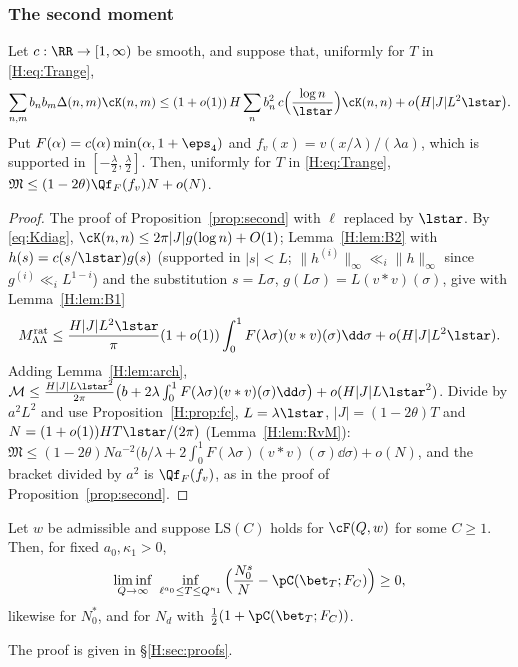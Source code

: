 \subsubsection*{The second moment}
\begin{proposition}\label{H:prop:second}
Let $c:\RR\to[1,\infty)$ be smooth, and suppose that, uniformly for $T$ in \eqref{H:eq:Trange},
\begin{equation}\label{H:eq:profile}
\sum_{n,m}b_nb_m\Delta(n,m)\cK(n,m)\le(1+o(1))\,H\sum_nb_n^2\,c\Big(\frac{\log n}{\lstar}\Big)\cK(n,n)+o\big(H|J|L^2\lstar\big).
\end{equation}
Put $F(\alpha)=c(\alpha)\min(\alpha,1+\eps_4)$ and $f_v(x)=v(x/\lambda)/(\lambda a)$, which is supported in $[-\frac\lambda2,\frac\lambda2]$. Then, uniformly for $T$ in \eqref{H:eq:Trange}, $\mathfrak M\le(1-2\theta)\Qf_F(f_v)N+o(N)$.
\end{proposition}
\begin{proof}
The proof of Proposition~\ref{prop:second} with $\ell$ replaced by $\lstar$. By \eqref{eq:Kdiag}, $\cK(n,n)\le2\pi|J|g(\log n)+O(1)$; Lemma~\ref{H:lem:B2} with $h(s)=c(s/\lstar)g(s)$ (supported in $|s|<L$; $\|h^{(i)}\|_\infty\ll_i\|h\|_\infty$ since $g^{(i)}\ll_iL^{1-i}$) and the substitution $s=L\sigma$, $g(L\sigma)=L(v*v)(\sigma)$, give with Lemma~\ref{H:lem:B1}
\[
M^{\rm rat}_{\Lambda\Lambda}\le\frac{H|J|L^2\lstar}\pi(1+o(1))\int_0^1F(\lambda\sigma)(v*v)(\sigma)\dd\sigma+o(H|J|L^2\lstar).
\]
Adding Lemma~\ref{H:lem:arch},
$\mathcal M\le\frac{H|J|L\lstar^2}{2\pi}\big(b+2\lambda\int_0^1F(\lambda\sigma)(v*v)(\sigma)\dd\sigma\big)+o(H|J|L\lstar^2)$. Divide by $a^2L^2$ and use Proposition~\ref{H:prop:fc}, $L=\lambda\lstar$, $|J|=(1-2\theta)T$ and $N=(1+o(1))HT\lstar/(2\pi)$ (Lemma~\ref{H:lem:RvM}): $\mathfrak M\le(1-2\theta)Na^{-2}\big(b/\lambda+2\int_0^1F(\lambda\sigma)(v*v)(\sigma)\dd\sigma\big)+o(N)$, and the bracket divided by $a^2$ is $\Qf_F(f_v)$, as in the proof of Proposition~\ref{prop:second}.
\end{proof}

\begin{theorem}\label{H:thm:cond}
Let $w$ be admissible and suppose $\mathrm{LS}(C)$ holds for $\cF(Q,w)$ for some $C\ge1$. Then, for fixed $a_0,\kappa_1>0$,
\[
\liminf_{Q\to\infty}\ \inf_{\ell^{a_0}\le T\le Q^{\kappa_1}}\Big(\frac{N^s_0}N-\pC(\bet_T;F_C)\Big)\ge0,
\]
likewise for $N^*_0$, and for $N_d$ with $\frac12(1+\pC(\bet_T;F_C))$.
\end{theorem}
The proof is given in \S\ref{H:sec:proofs}.


